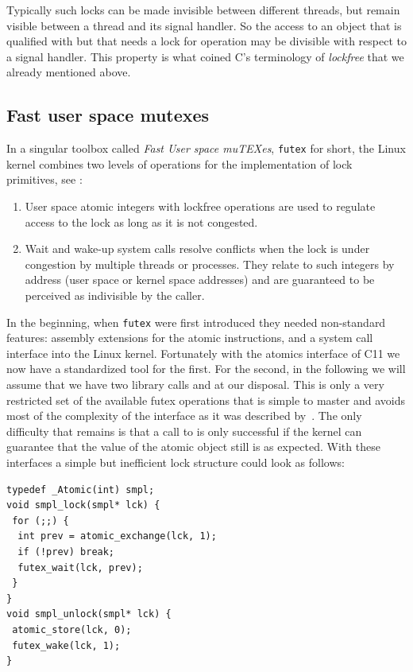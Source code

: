 Typically such locks can be made invisible between different
threads, but remain visible between a thread and its signal
handler. So the access to an object that is qualified with
 but that needs a lock for operation may be divisible with
respect to a signal handler. This property is what coined C's
terminology of \emph{lockfree} that we already mentioned above.

\subsection{Fast user space mutexes}
\label{sec-2-3}
\fi

In a singular toolbox called \emph{Fast User space muTEXes}, \texttt{futex} for
short, the Linux kernel combines two levels of operations for the
implementation of lock primitives, see
\cite{Hutton02fuss,hart09}:
\iflong
\begin{enumerate}
\item User space atomic integers with lockfree operations are used to
regulate access to the lock as long as it is not congested.\itemadjust

\item Wait and wake-up system calls resolve conflicts when the lock is
under congestion by multiple threads or processes. They relate
to such integers by address (user space or kernel space
addresses) and are guaranteed to be perceived as indivisible by
the caller.\itemadjust
\end{enumerate}

In the beginning, when \texttt{futex} were first introduced they needed
non-standard features: assembly extensions for the atomic
instructions, and a system call interface into the Linux
kernel. Fortunately with the atomics interface of C11 we now have
a standardized tool for the first. For the second, in the
following we will assume that we have two library calls
 and  at our disposal.
%
This is only a very restricted set of the available futex operations that
is simple to master and avoids most of the complexity of the interface as
it was described by~\cite{drepper11:futex}. The only difficulty that
remains is that a call to  is only successful if the
kernel can guarantee that the value of the atomic object still is as
expected.
%
\fi
With these interfaces a simple but
inefficient lock structure  could look as follows:

\lstset{language=C11,label= ,caption= ,numbers=none}
\begin{lstlisting}
typedef _Atomic(int) smpl;
void smpl_lock(smpl* lck) {
 for (;;) {
  int prev = atomic_exchange(lck, 1);
  if (!prev) break;
  futex_wait(lck, prev);
 }
}
void smpl_unlock(smpl* lck) {
 atomic_store(lck, 0);
 futex_wake(lck, 1);
}
\end{lstlisting}

